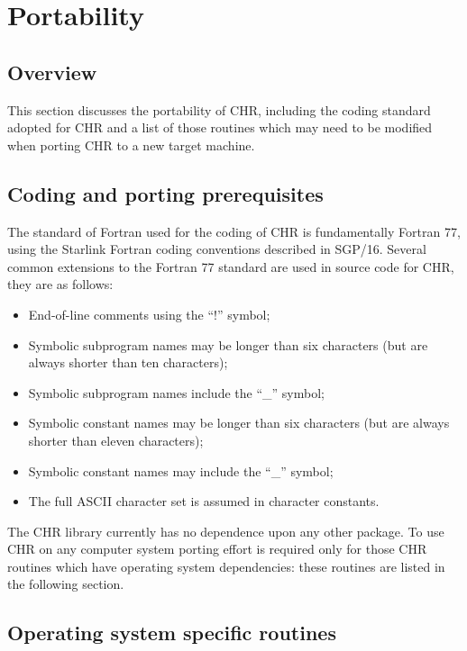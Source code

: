 \documentclass[twoside,11pt,nolof]{starlink}
\begin{document}
\newpage

\section {Portability}

\subsection {Overview}

This section discusses the portability of CHR, including the coding
standard adopted for CHR and a list of those routines which
may need to be modified when porting CHR to a new target machine.


\subsection {Coding and porting prerequisites}

The standard of Fortran used for the coding of CHR is fundamentally
Fortran 77, using the Starlink Fortran coding conventions described in SGP/16.
Several common extensions to the Fortran 77 standard are used in source
code for CHR, they are as follows:

\begin {itemize}
\item End-of-line comments using the ``!'' symbol;
\item Symbolic subprogram names may be longer than six characters (but are
always shorter than ten characters);
\item Symbolic subprogram names include the ``\_'' symbol;
\item Symbolic constant names may be longer than six characters (but are always
shorter than eleven characters);
\item Symbolic constant names may include the ``\_'' symbol;
\item The full ASCII character set is assumed in character constants.
\end {itemize}

The CHR library currently has no dependence upon any other package.
To use CHR on any computer system porting effort is required only for those
CHR routines which have operating system dependencies: these routines are
listed in the following section.


\subsection {Operating system specific routines}
\end{document}
